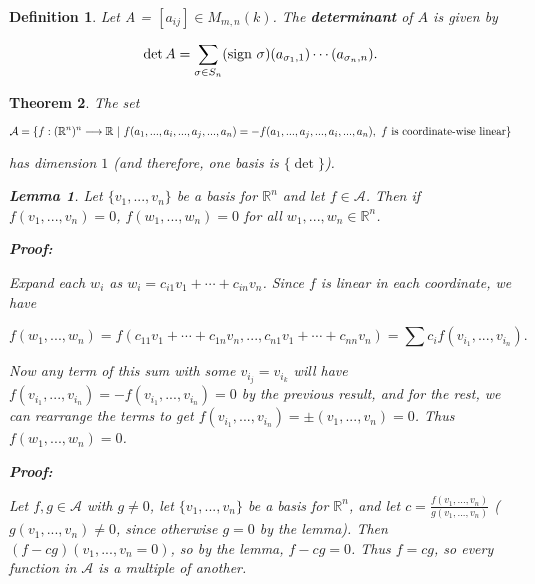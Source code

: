 \documentclass{article}
\theoremstyle{colontheorem}
\newtheorem{theorem}{Theorem}[section]
\newtheorem{definition}[theorem]{Definition}
\newtheorem{lemma}{Lemma}[theorem]
\newenvironment{Theorem}
{
	\begin{mdframed}[backgroundcolor=TheoremOrange!10]
	\begin{theorem}
}
{
	\end{theorem}
	\end{mdframed}
	
	\vspace{.15in}
}
\newenvironment{Def}
{
	\begin{mdframed}[backgroundcolor=DefGreen!10]
	\begin{definition}
}
{
	\end{definition}
	\end{mdframed}
	
	\vspace{.15in}
}
\newenvironment{Lemma}
{
	\begin{mdframed}[backgroundcolor=LemmaYellow!10]
	\begin{lemma}
}
{
	\end{lemma}
	\end{mdframed}
	
	\vspace{.03in}
}
\newenvironment{Proof}
{
	\begin{mdframed}[backgroundcolor=ProofPurple!10]
	\textbf{Proof:}%
}
{
	\end{mdframed}
	
	\vspace{.085in}
}
\begin{document}
\begin{Def}
	
	Let A = $[a_{ij}] \in M_{m, n}(k)$. The \textbf{determinant} of $A$ is given by
	
	$$
		\det A = \sum\limits_{\sigma \in S_n} (\textnormal{sign } \sigma)(a_{\sigma_1, 1}) \cdots (a_{\sigma_n, n}).
	$$
	
\end{Def}



\begin{Theorem}
	
	The set
	
	$$
		\mathcal{A} = \{f : (\mathbb{R}^n)^n \longrightarrow \mathbb{R}\ |\ f(a_1, ..., a_i, ..., a_j, ..., a_n) = -f(a_1, ..., a_j, ..., a_i, ..., a_n), \\ \ f \textnormal{ is coordinate-wise linear} \}
	$$
	
	has dimension $1$ (and therefore, one basis is $\{\det\}$).
	
	\begin{Lemma}
		
		Let $\{v_1, ..., v_n\}$ be a basis for $\mathbb{R}^n$ and let $f \in \mathcal{A}$. Then if $f(v_1, ..., v_n) = 0$, $f(w_1, ..., w_n) = 0$ for all $w_1, ..., w_n \in \mathbb{R}^n$.
		
		\begin{Proof}
			Expand each $w_i$ as $w_i = c_{i1} v_1 + \cdots + c_{in} v_n$. Since $f$ is linear in each coordinate, we have
			
			$$
				f(w_1, ..., w_n) = f(c_{11} v_1 + \cdots + c_{1n} v_n, ..., c_{n1} v_1 + \cdots + c_{nn} v_n) = \sum c_i f(v_{i_1}, ..., v_{i_n}).
			$$
			
			Now any term of this sum with some $v_{i_j} = v_{i_k}$ will have $f(v_{i_1}, ..., v_{i_n}) = -f(v_{i_1}, ..., v_{i_n}) = 0$ by the previous result, and for the rest, we can rearrange the terms to get $f(v_{i_1}, ..., v_{i_n}) = \pm (v_1, ..., v_n) = 0$. Thus $f(w_1, ..., w_n) = 0$.
			
		\end{Proof}
		
	\end{Lemma}
	
	\begin{Proof}
		Let $f, g \in \mathcal{A}$ with $g \neq 0$, let $\{v_1, ..., v_n\}$ be a basis for $\mathbb{R}^n$, and let $c = \frac{f(v_1, ..., v_n)}{g(v_1, ..., v_n)}$ ($g(v_1, ..., v_n) \neq 0$, since otherwise $g = 0$ by the lemma). Then $(f - cg)(v_1, ..., v_n = 0)$, so by the lemma, $f - cg = 0$. Thus $f = cg$, so every function in $\mathcal{A}$ is a multiple of another.
		
	\end{Proof}
	
\end{Theorem}
\end{document}
